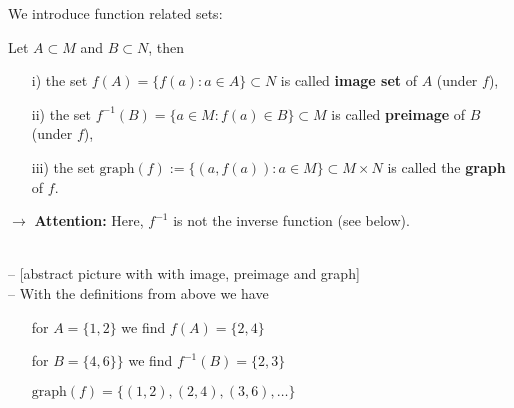 \begin{frame}
	We introduce function related sets: \vspace{-0.3cm}
	\begin{defi}\label{def:image_preimage_graph}
		Let $A \subset M$ and $B \subset N$, then
		\begin{itemize} \color{defgruen}
			\item[i)] the set $f(A) = \{f(a) : a\in A\} \subset N$ is called \textbf{image set} of $A$ (under $f$),
			\item[ii)] the set $f^{-1}(B)=\lbrace a\in M: f(a)\in B\rbrace \subset M$ is called \textbf{preimage} of $B$ (under $f$),
			\item[iii)] the set $\text{graph}(f) := \{(a,f(a))\colon a \in M\} \subset M\times N$ is called the \textbf{graph} of $f$.
		\end{itemize} 
	\end{defi}
	$\rightarrow$ \textbf{Attention:} Here, $f^{-1}$ is not the inverse function (see below).\\ \vspace{0.2cm}
	~\\
	{\blank
	-- {\small\color{header}[abstract picture with  with image, preimage and graph]}\\
	-- With the definitions from above we have
	\begin{itemize}
		\blank
		\item[] for $A=\{1,2\}$ we find $f(A) = \{2,4\}$
		\item[] for $B=\{4,6\}\}$ we find $f^{-1}(B) = \{2,3\}$
		\item[] $\text{graph}(f) = \{(1,2), (2,4), (3,6), \ldots\}$
	\end{itemize}
}	
\end{frame}


